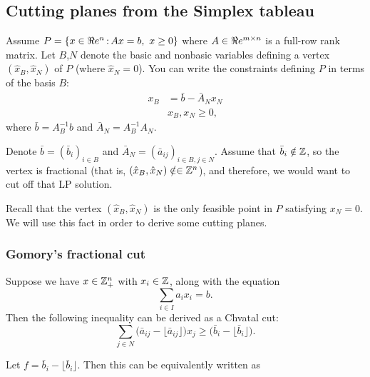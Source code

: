 \subsection{Cutting planes from the Simplex tableau}
Assume $P=\{x\in\R^n\tq Ax=b,\ x\geq0\}$ where $A\in\Re e^{m\times n}$ is a full-row rank matrix. Let $B$,$N$ denote the basic and nonbasic variables defining a vertex $(\hat x_B,\hat x_N)$ of $P$ (where $\hat x_N=0$). You can write the constraints defining $P$ in terms of the basis $B$:
\begin{align*}
x_B&=\bar b -\bar A_N x_N\\
&x_B,x_N\geq0,
\end{align*}
where $\bar b=A_B^{-1}b$ and $\bar A_N=A_B^{-1}A_N$. 

\vspace{0.2cm}

Denote $\bar b=(\bar b_i)_{i\in B}$ and  $\bar A_N=(\bar a_{ij})_{i\in B, j\in N}$. Assume that $\bar b_i\notin {\mathbb{Z}}$, so the vertex is fractional \big(that is, $(\hat x_B,\hat x_N)\notin \in {\mathbb{Z}}^n$\big), and therefore, we would want to cut off that LP solution.

\begin{remark}{}{} Recall that the vertex $(\hat x_B,\hat x_N)$ is the only feasible point in $P$ satisfying $x_N=0$. We will use this fact in order to derive some cutting planes.
\end{remark}

\subsubsection{Gomory's fractional cut}
Suppose we have $x \in {\mathbb{Z}}^n_+$ with $x_i \in {\mathbb{Z}}$, along with the equation
\begin{equation}
\sum_{i \in I} a_{i}x_{i} = b.
\end{equation}
Then the following inequality can be derived as a Chvatal cut:
\begin{equation}\sum_{j\in N}\big(\bar a_{ij}-\lfloor \bar a_{ij} \rfloor \big)x_j\geq (\bar b_{i}-\lfloor \bar b_{i} \rfloor \big).\end{equation}

Let $f = \bar b_{i}-\lfloor \bar b_{i} \rfloor $.  Then this can be equivalently written as 

